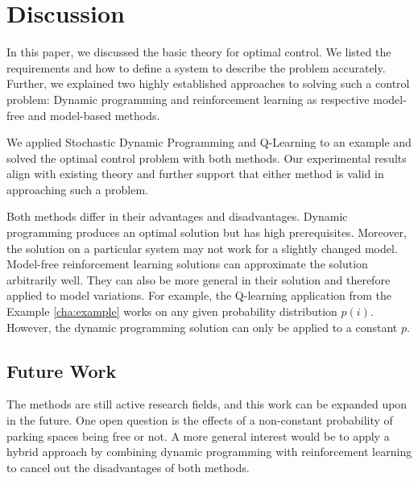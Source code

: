 
\chapter{Discussion}
\label{cha:discussion}

In this paper, we discussed the basic theory for optimal control. We listed the requirements and how to define a system to describe the problem accurately. Further, we explained two highly established approaches to solving such a control problem: Dynamic programming and reinforcement learning as respective model-free and model-based methods.

We applied Stochastic Dynamic Programming and Q-Learning to an example and solved the optimal control problem with both methods. Our experimental results align with existing theory and further support that either method is valid in approaching such a problem.

Both methods differ in their advantages and disadvantages. Dynamic programming produces an optimal solution but has high prerequisites. Moreover, the solution on a particular system may not work for a slightly changed model. Model-free reinforcement learning solutions can approximate the solution arbitrarily well. They can also be more general in their solution and therefore applied to model variations. For example, the Q-learning application from the Example \ref{cha:example} works on any given probability distribution $p(i)$. However, the dynamic programming solution can only be applied to a constant $p$.

\section{Future Work}
\label{sec:future_work}

The methods are still active research fields, and this work can be expanded upon in the future. One open question is the effects of a non-constant probability of parking spaces being free or not. 
A more general interest would be to apply a hybrid approach by combining dynamic programming with reinforcement learning to cancel out the disadvantages of both methods.

